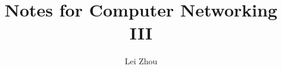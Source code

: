 \documentclass{article}
\begin{document}
\title{Notes for Computer Networking III}
\author{Lei Zhou}
\maketitle

%

%


\end{document}
